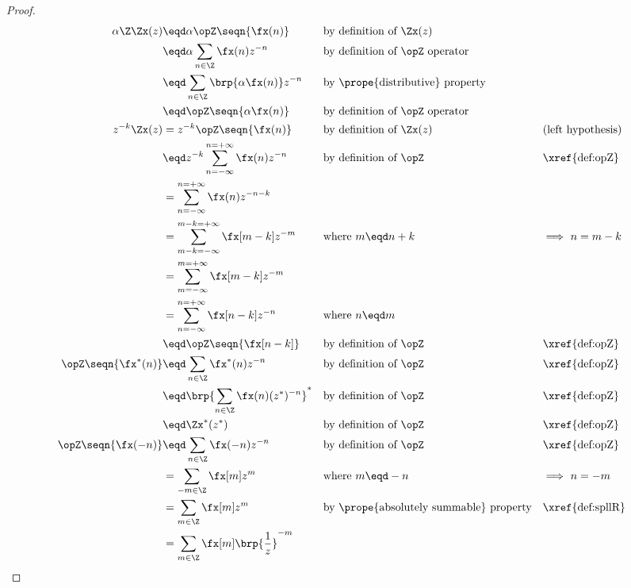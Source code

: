 \begin{proof}
\begin{align*}
  \alpha\Z\Zx(z)
    &\eqd \alpha \opZ \seqn{\fx(n)}                && \text{by definition of $\Zx(z)$}
  \\&\eqd \alpha \sum_{n\in\Z} \fx(n) z^{-n}       && \text{by definition of $\opZ$ operator}
  \\&\eqd \sum_{n\in\Z} \brp{\alpha\fx(n)} z^{-n}  && \text{by \prope{distributive} property}
  \\&\eqd \opZ\seqn{\alpha\fx(n)}                  && \text{by definition of $\opZ$ operator}
  \\
  z^{-k}\Zx(z) 
    &= z^{-k} \opZ\seqn{\fx(n)}
    && \text{by definition of $\Zx(z)$}
    && \text{(left hypothesis)}
  \\&\eqd z^{-k}\sum_{n=-\infty}^{n=+\infty} \fx(n) z^{-n}
    && \text{by definition of $\opZ$}
    && \text{\xref{def:opZ}}
  \\&=          \sum_{n=-\infty}^{n=+\infty} \fx(n) z^{-n-k}
  \\&=          \sum_{m-k=-\infty}^{m-k=+\infty} \fx[m-k] z^{-m}
    && \text{where $m\eqd n+k$}
    && \text{$\implies$ $n=m-k$}
  \\&=          \sum_{m=-\infty}^{m=+\infty} \fx[m-k] z^{-m}
  \\&=          \sum_{n=-\infty}^{n=+\infty} \fx[n-k] z^{-n}
    && \text{where $n\eqd m$}
  \\&\eqd \opZ\seqn{\fx[n-k]}
    && \text{by definition of $\opZ$}
    && \text{\xref{def:opZ}}
  \\
  \opZ\seqn{\fx^\ast(n)}  
    &\eqd \sum_{n\in\Z}\fx^\ast(n) z^{-n}
    && \text{by definition of $\opZ$}
    && \text{\xref{def:opZ}}
  \\&\eqd \brp{\sum_{n\in\Z}\fx(n) (z^\ast)^{-n}}^\ast
    && \text{by definition of $\opZ$}
    && \text{\xref{def:opZ}}
  \\&\eqd \Zx^\ast(z^\ast)
    && \text{by definition of $\opZ$}
    && \text{\xref{def:opZ}}
  \\
  \opZ\seqn{\fx(-n)}  
    &\eqd \sum_{n\in\Z}\fx(-n) z^{-n}
    && \text{by definition of $\opZ$}
    && \text{\xref{def:opZ}}
  \\&= \sum_{-m\in\Z}\fx[m] z^{m}
    && \text{where $m\eqd -n$}
    && \text{$\implies$ $n=-m$}
  \\&= \sum_{m\in\Z}\fx[m] z^{m}
    && \text{by \prope{absolutely summable} property}
    && \text{\xref{def:spllR}}
  \\&= \sum_{m\in\Z}\fx[m] \brp{\frac{1}{z}}^{-m}

\end{align*}
\end{proof}
